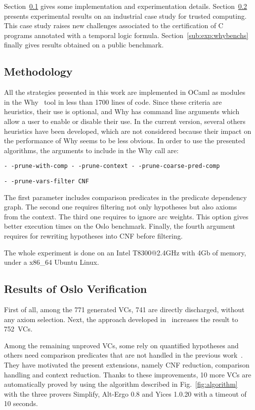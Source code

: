 \documentclass{acm_proc_article-sp}
\theoremstyle{nonumberplain}
\begin{document}
Section~\ref{sub:exp:method} gives some implementation and
experimentation details. Section~\ref{sub:oslo:res} presents
experimental results on an industrial case study for trusted computing.
This case study raises new challenges associated to the certification
of C programs annotated with a temporal logic formula.
Section~\ref{sub:exp:whybenchs} finally gives results obtained on a
public benchmark.


 
\subsection{Methodology}\label{sub:exp:method}
All the strategies presented in this work are implemented in OCaml as
modules in the Why~\cite{filliatre07cav} tool in less than 1700 lines
of code. Since these criteria are heuristics, their use is optional,
and Why has command line arguments which allow a user to enable or
disable their use. In the current version, several others heuristics
have been developed, which are not considered because their impact on
the performance of Why seems to be less obvious. In order to use the
presented algorithms, the arguments to include in the Why call are:

\centerline{
  \scriptsize
  \texttt{-\,-prune-with-comp -\,-prune-context  -\,-prune-coarse-pred-comp}}
\centerline{
  \scriptsize
  \texttt{-\,-prune-vars-filter CNF}}
  

The first parameter includes comparison predicates in the predicate
dependency graph. The second one requires filtering not only hypotheses
but also axioms from the context. The third one requires to ignore arc
weights. This option gives better execution times on the Oslo
benchmark. Finally, the fourth argument requires for rewriting
hypotheses into CNF before filtering.



The whole experiment is done on an Intel T8300@2.4GHz with 4Gb of 
memory, under a x86\_64 Ubuntu Linux.


\subsection{Results of Oslo Verification}\label{sub:oslo:res}
First of all, among the 771 generated VCs, 741  are directly 
discharged, without any axiom selection. Next, the approach
developed in~\cite{couchot07FTP} increases the result to
752~VCs.


Among the remaining unproved VCs, some rely on quantified hypotheses
and others need comparison predicates that are not handled 
in the previous work~\cite{couchot07FTP}.
They have motivated the present extensions, namely
CNF reduction, comparison handling and context reduction. 
Thanks to these improvements, 10 more VCs are automatically
proved by using the algorithm described in 
Fig.~\ref{fig:algorithm} with the three provers Simplify,
Alt-Ergo 0.8 and Yices 1.0.20 with a timeout  of 10 seconds.
\end{document}
